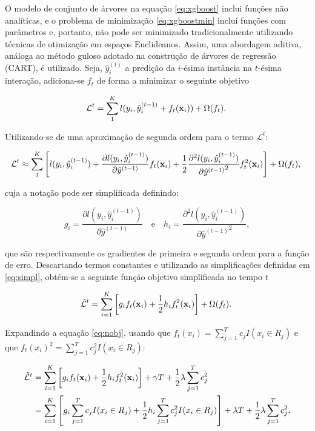 O modelo de conjunto de árvores na equação \eqref{eq:xgboost} inclui funções não analíticas, e o problema de minimização \eqref{eq:xgboostmin} incluí funções com parâmetros e, portanto, não pode ser minimizado tradicionalmente utilizando técnicas de otimização em espaços Euclideanos. Assim, uma abordagem aditiva, análoga ao método guloso adotado na construção de árvores de regressão (CART), é utilizado. Seja, $\hat{y}_{i}^{(t)}$ a predição da $i$-ésima instância na $t$-ésima interação, adiciona-se $f_t$ de forma a minimizar o seguinte objetivo

\begin{equation}
\mathcal{L}^{t}=\sum_{1}^{K}l(y_i, \hat{y}_i^{(t-1)}+f_t({\bf x}_i))+\Omega(f_t)\mbox{.}~
\end{equation}

Utilizando-se de uma aproximação de segunda ordem para o termo $\mathcal{L}^{t}$:

\begin{equation}
\mathcal{L}^{t}\approx\sum_{1}^{K}\left[l(y_i, \hat{y}_i^{(t-1)})+\frac{\partial l(y_i, \hat{y}_i^{(t-1)})}{\partial\hat{y }^{(t-1)}}f_t({\bf x}_i)+\frac{1}{2}\frac{\partial^2 l(y_i, \hat{y}_i^{(t-1)})}{{\partial\hat{y }^{(t-1)}}^2}f_t^2({\bf x}_i)\right]+\Omega(f_t)\mbox{,}~
\end{equation}

cuja a notação pode ser simplificada definindo:

\begin{equation}\label{eq:simpl}
g_i=\frac{\partial l(y_i, \hat{y}_i^{(t-1)})}{\partial\hat{y }^{(t-1)}} \quad \mbox{e} \quad h_i=\frac{\partial^2 l(y_i, \hat{y}_i^{(t-1)})}{{\partial\hat{y }^{(t-1)}}^2}\mbox{,}~
\end{equation}

que são respectivamente os gradientes de primeira e segunda ordem para a função de erro. Descartando termos constantes e utilizando as simplificações definidas em \eqref{eq:simpl}, obtém-se a seguinte função objetivo simplificada no tempo $t$

\begin{equation}\label{eq:nobj}
\mathcal{\tilde{L}}^{t}=\sum_{i=1}^{K}\left[g_if_t({\bf x}_i)+\frac{1}{2}h_if_t^2({\bf x}_i)\right]+\Omega(f_t)\mbox{.}~
\end{equation}

Expandindo a equação \eqref{eq:nobj}, usando que $f_t(x_i)=\sum_{j=1}^{T}c_jI(x_i\in R_j)$ e que $f_t(x_i)^2=\sum_{j=1}^{T}c_j^2I(x_i\in R_j)$:

\begin{align}\label{eq:nobj1}
\mathcal{\tilde{L}}^{t}&=\sum_{i=1}^{K}\left[g_if_t({\bf x}_i)+\frac{1}{2}h_if_t^2({\bf x}_i)\right]+\gamma T + \frac{1}{2}\lambda\sum_{j=1}^Tc_j^2 \\
                       &=\sum_{i=1}^{K}\left[g_i\sum_{j=1}^{T}c_jI(x_i\in R_j)+\frac{1}{2}h_i\sum_{j=1}^{T}c_j^2I(x_i\in R_j)\right]+\lambda{T} + \frac{1}{2}\lambda\sum_{j=1}^Tc_j^2\mbox{,}
\end{align}

